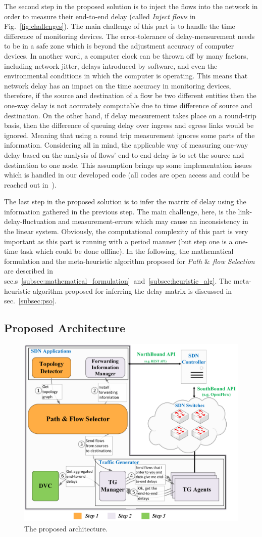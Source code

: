 \documentclass[10pt, journal, letterpaper]{IEEEtran}
\begin{document}
The second step in the proposed solution is to inject the flows into the network in order to measure their end-to-end delay (called \textit{Inject flows} in Fig.~\ref{fig:challenges}). The main challenge of this part is to handle the time difference of monitoring devices. The error-tolerance of delay-measurement needs to be in a safe zone which is beyond the adjustment accuracy of computer devices. In another word, a computer clock can be thrown off by many factors, including network jitter, delays introduced by software, and even the environmental conditions in which the computer is operating. This means that network delay has an impact on the time accuracy in monitoring devices, therefore, if the source and destination of a flow be two different entities then the one-way delay is not accurately computable due to time difference of source and destination. On the other hand, if delay measurement takes place on a round-trip basis, then the difference of queuing delay over ingress and egress links would be ignored. Meaning that using a round trip measurement ignores some parts of the information. Considering all in mind, the applicable way of measuring one-way delay based on the analysis of flows' end-to-end delay is to set the source and destination to one node. This assumption brings up some implementation issues which is handled in our developed code (all codes are open access and could be reached out in~\cite{monitoringCodeOurImplementation}).

The last step in the proposed solution is to infer the matrix of delay using the information gathered in the previous step. The main challenge, here, is the link-delay-fluctuation and measurement-errors which may cause an inconsistency in the linear system. Obviously, the computational complexity of this part is very important as this part is running with a period manner (but step one is a one-time task which could be done offline). In the following, the mathematical formulation and the meta-heuristic algorithm proposed for \textit{Path $\&$ flow Selection} are described in sec.s~\ref{subsec:mathematical_formulation}~and~\ref{subsec:heuristic_alg}. The meta-heuristic algorithm proposed for inferring the delay matrix is discussed in sec.~\ref{subsec:pso}.

\subsection{Proposed Architecture}
\begin{figure}
    \centering
    \includegraphics[width=0.49\columnwidth]{img/architecture.png}
    \caption{The proposed architecture.}
    \label{fig:architecture}
\end{figure}
\end{document}
